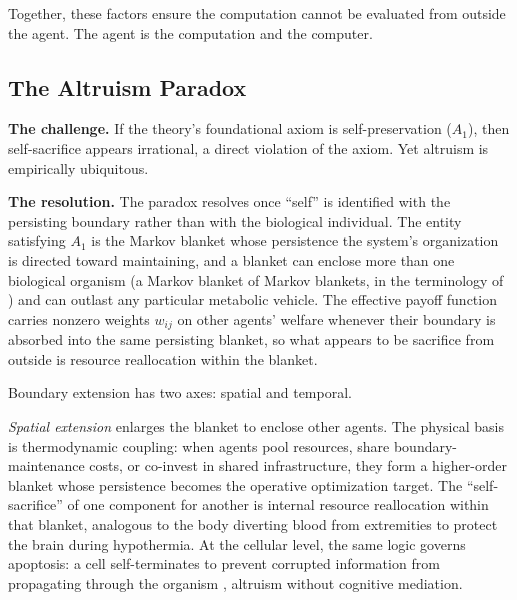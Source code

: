 \documentclass[11pt]{article}
\theoremstyle{plain}
\theoremstyle{definition}
\theoremstyle{remark}
\let\origsubsection\subsection
\renewcommand{\subsection}{\needspace{7\baselineskip}\origsubsection}
\begin{document}
Together, these factors ensure the computation cannot be evaluated from
outside the agent. The agent is the computation and the computer.

\subsection{The Altruism Paradox}\label{the-altruism-paradox}

\textbf{The challenge.} If the theory's foundational axiom is
self-preservation (\(A_1\)), then self-sacrifice appears irrational, a
direct violation of the axiom. Yet altruism is empirically ubiquitous.

\textbf{The resolution.} The paradox resolves once ``self'' is
identified with the persisting boundary rather than with the biological
individual. The entity satisfying \(A_1\) is the Markov blanket
\citep{Pearl2000, KirchhoffFriston2018} whose persistence the system's
organization is directed toward maintaining, and a blanket can enclose
more than one biological organism (a Markov blanket of Markov blankets,
in the terminology of \citep{KirchhoffFriston2018}) and can outlast any
particular metabolic vehicle. The effective payoff function carries
nonzero weights \(w_{ij}\) on other agents' welfare whenever their
boundary is absorbed into the same persisting blanket, so what appears
to be sacrifice from outside is resource reallocation within the
blanket.

Boundary extension has two axes: spatial and temporal.

\emph{Spatial extension} enlarges the blanket to enclose other agents.
The physical basis is thermodynamic coupling: when agents pool
resources, share boundary-maintenance costs, or co-invest in shared
infrastructure, they form a higher-order blanket whose persistence
becomes the operative optimization target. The ``self-sacrifice'' of one
component for another is internal resource reallocation within that
blanket, analogous to the body diverting blood from extremities to
protect the brain during hypothermia. At the cellular level, the same
logic governs apoptosis: a cell self-terminates to prevent corrupted
information from propagating through the organism \citep{Elmore2007},
altruism without cognitive mediation.
\end{document}

